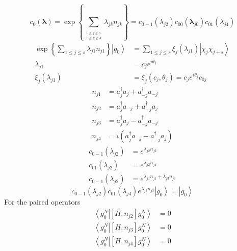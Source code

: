 \documentclass[aps,preprint]{revtex4}%
\begin{document}
\begin{equation}
c_{0}\left(  \mathbf{\lambda}\right)  =\exp\left\{  \sum
\limits_{_{\substack{1\leq j\leq s\\1\leq k\leq4}}}\lambda_{jk}n_{jk}\right\}
=c_{0-1}\left(  \lambda_{j2}\right)  c_{00}\left(  \mathbf{\lambda}%
_{j0}\right)  c_{01}\left(  \lambda_{j4}\right)
\end{equation}%
\begin{align}
\exp\left\{  \sum_{1\leq j\leq s}\lambda_{j1}n_{j1}\right\}  \left\vert
g_{0}\right\rangle  &  =\sum_{1\leq j\leq s}\xi_{j}\left(  \lambda
_{j1}\right)  \left\vert \chi_{j}\chi_{j+s}\right\rangle \\
\lambda_{j1}  &  =c_{j}e^{i\theta_{j}}\\
\xi_{j}\left(  \lambda_{j1}\right)   &  =\xi_{j}\left(  c_{j},\theta
_{j}\right)  =c_{j}e^{i\theta_{j}}c_{0j}%
\end{align}%
\begin{align}
n_{j1}  &  =a_{j}^{\dagger}a_{j}+a_{-j}^{\dagger}a_{-j}\nonumber\\
n_{j2}  &  =a_{j}^{\dagger}a_{-j}+a_{-j}^{\dagger}a_{j}\\
n_{j3}  &  =a_{j}^{\dagger}a_{j}-a_{-j}^{\dagger}a_{-j}\\
n_{j4}  &  =i\left(  a_{j}^{\dagger}a_{-j}-a_{-j}^{\dagger}a_{j}\right)
\end{align}%
\begin{align}
c_{0-1}\left(  \lambda_{j2}\right)   &  =e^{\lambda_{j2}n_{j2}}\\
c_{01}\left(  \lambda_{j2}\right)   &  =e^{\lambda_{j2}n_{j4}}\\
c_{0-1}\left(  \lambda_{j2}\right)   &  =e^{\lambda_{j1}n_{j1}+\lambda
_{j3}n_{j3}}%
\end{align}%
\begin{equation}
c_{0-1}\left(  \lambda_{j2}\right)  c_{01}\left(  \lambda_{j4}\right)
e^{\lambda_{j3}n_{j3}}\left\vert g_{0}\right\rangle =\left\vert g_{0}%
\right\rangle
\end{equation}
For the paired operators
\begin{align}
\left\langle g_{0}^{N}\right.  \left\vert \left[  H,n_{j2}\right]  g_{0}%
^{N}\right\rangle  &  =0\\
\left\langle g_{0}^{N}\right.  \left\vert \left[  H,n_{j3}\right]  g_{0}%
^{N}\right\rangle  &  =0\\
\left\langle g_{0}^{N}\right.  \left\vert \left[  H,n_{j4}\right]  g_{0}%
^{N}\right\rangle  &  =0
\end{align}
\end{document}
